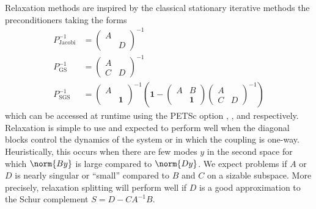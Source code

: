 Relaxation methods are inspired by the classical stationary iterative methods the preconditioners taking the forms
\begin{align*}
  P^{-1}_{\text{Jacobi}} &= \begin{pmatrix} A & \\ & D \end{pmatrix}^{-1} \\
  P^{-1}_{\text{GS}} &= \begin{pmatrix} A & \\ C & D \end{pmatrix}^{-1} \\
  P^{-1}_{\text{SGS}} &=
      \begin{pmatrix} A & \\  & \bm 1 \end{pmatrix}^{-1}
      \left(
        \bm 1 -
        \begin{pmatrix} A & B \\ & \bm 1 \end{pmatrix}
        \begin{pmatrix} A & \\ C & D \end{pmatrix}^{-1}
      \right)
\end{align*}
which can be accessed at runtime using the PETSc option , , and  respectively.
Relaxation is simple to use and expected to perform well when the diagonal blocks control the dynamics of the system or in which the coupling is one-way.
Heuristically, this occurs when there are few modes $y$ in the second space for which $\norm{B y}$ is large compared to $\norm{D y}$.
We expect problems if $A$ or $D$ is nearly singular or ``small'' compared to $B$ and $C$ on a sizable subspace.
More precisely, relaxation splitting will perform well if $D$ is a good approximation to the Schur complement $S = D - CA^{-1}B$.

